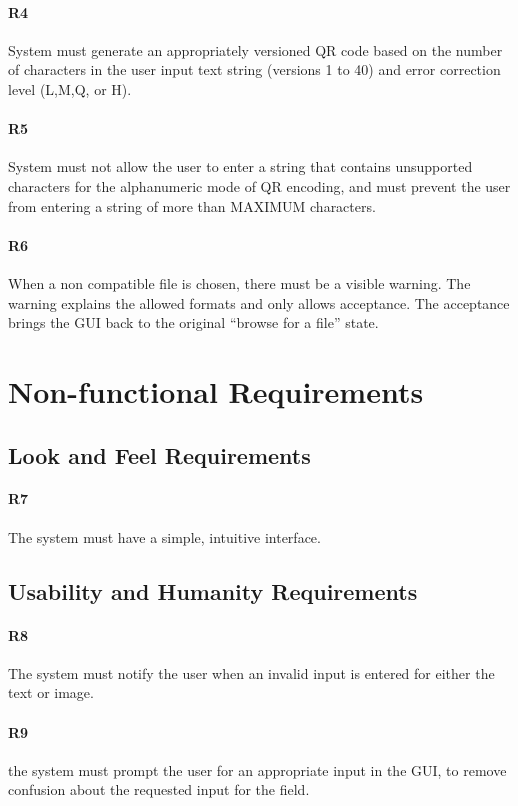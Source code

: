 \documentclass[12pt, titlepage]{article}
\begin{document}
	\paragraph{R4}
	System must generate an appropriately versioned QR code based on the number of 
	characters in the user input text string (versions 1 to 40) and error 
	correction level (L,M,Q, or H).
	\paragraph{R5}
	System must not allow the user to enter a string that contains unsupported 
	characters for the alphanumeric mode of QR encoding, and must prevent the 
	user from entering a string of more than MAXIMUM characters.
	\paragraph{R6}	
	When a non compatible file is chosen, there must be a visible warning. The 
	warning explains the allowed formats and only allows acceptance. The 
	acceptance brings the GUI back to the original “browse for a file” state.
	
	

\section{Non-functional Requirements}

\subsection{Look and Feel Requirements}
	
	 \paragraph{R7}The system must have a simple, intuitive interface.
	
	
\subsection{Usability and Humanity Requirements}

    \paragraph{R8}
	The system must notify the user when an invalid input is entered for either 
	the text or image.
    \paragraph{R9}
	the system must prompt the user for an appropriate input in the GUI, to 
	remove confusion about the requested input for the field.
\end{document}
